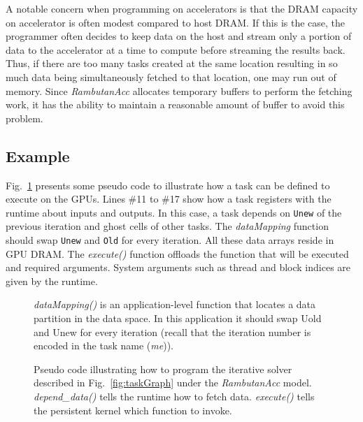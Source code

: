A notable concern when programming on accelerators is that the DRAM capacity on accelerator is often modest compared to host DRAM.
If this is the case, the programmer often decides to keep data on the host and stream only a portion of data to the accelerator at a time to compute before streaming the results back.
Thus, if there are too many tasks created at the same location resulting in so much data being simultaneously fetched to that location, one may run out of memory.
Since {\em RambutanAcc} allocates temporary buffers to perform the fetching work, it has the ability to maintain a reasonable amount of buffer to avoid this problem.


\subsection{Example}
Fig.~\ref{fig:firstProgram} presents some pseudo code to illustrate how a task can be defined to execute on the GPUs.
Lines \#11 to \#17 show how a task registers with the runtime about inputs and outputs.
In this case, a task depends on {\tt Unew} of the previous iteration and ghost cells of other tasks.
The {\em dataMapping} function should swap {\tt Unew} and {\tt Old} for every iteration.
All these data arrays reside in GPU DRAM.
The {\em execute()} function offloads the function that will be executed and required arguments.
System arguments such as thread and block indices are given by the runtime.


\begin{figure}[htp]

\caption{Pseudo code illustrating how to program the iterative solver described in Fig.~\ref{fig:taskGraph} under the {\em RambutanAcc} model. {\em depend\_data()} tells the runtime how to fetch data. 
{\em execute()} tells the persistent kernel which function to invoke.}
{\em dataMapping()} is an application-level function that locates a data partition in the data space. In this application it should swap Uold and Unew for every iteration (recall that the iteration number is encoded in the task name ({\em me})).
\label{fig:firstProgram}
\end{figure}

